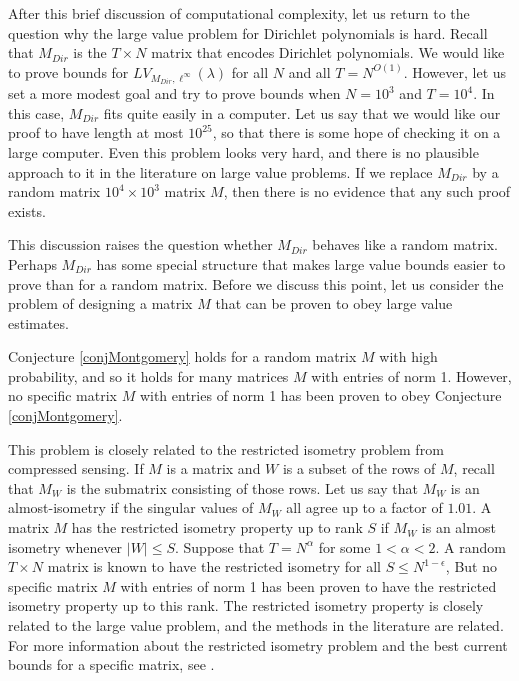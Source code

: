 \documentclass{amsart}
\begin{document}
After this brief discussion of computational complexity, let us return to the question why the large value problem for Dirichlet polynomials is hard. Recall that $M_{Dir}$ is the $T \times N$ matrix that encodes Dirichlet polynomials.   We would like to prove bounds for $LV_{M_{Dir}, \ell^\infty}(\lambda)$ for all $N$ and all $T = N^{O(1)}$.  However, let us set a more modest goal and try to prove bounds when $N= 10^3$ and $T = 10^4$.  In this case, $M_{Dir}$ fits quite easily in a computer.  Let us say that we would like our proof to have length at most $10^{25}$, so that there is some hope of checking it on a large computer.  Even this problem looks very hard, and there is no plausible approach to it in the literature on large value problems.  If we replace $M_{Dir}$ by a random matrix $10^4 \times 10^3$ matrix $M$, then there is no evidence that any such proof exists. 

This discussion raises the question whether $M_{Dir}$ behaves like a random matrix.  Perhaps $M_{Dir}$ has some special structure that makes large value bounds easier to prove than for a random matrix.  Before we discuss this point, let us consider the problem of designing a matrix $M$ that can be proven to obey large value estimates.

Conjecture \ref{conjMontgomery} holds for a random matrix $M$ with high probability, and so it holds for many matrices $M$ with entries of norm 1.  However, no specific matrix $M$ with entries of norm 1 has been proven to obey Conjecture \ref{conjMontgomery}.  

This problem is closely related to the restricted isometry problem from compressed sensing.  If $M$ is a matrix and $W$ is a subset of the rows of $M$, recall that $M_W$ is the submatrix consisting of those rows.  Let us say that $M_W$ is an almost-isometry if the singular values of $M_W$ all agree up to a factor of $1.01$.   A matrix $M$ has the restricted isometry property up to rank $S$ if $M_W$ is an almost isometry whenever $ |W| \le S$.   Suppose that $T = N^\alpha$ for some $1 < \alpha < 2$.   A random $ T \times N$ matrix is known to have the restricted isometry for all $S \le N^{1 - \epsilon}$,  But no specific matrix $M$ with entries of norm 1 has been proven to have the restricted isometry property up to this rank.  The restricted isometry property is closely related to the large value problem, and the methods in the literature are related.  For more information about the restricted isometry problem and the best current bounds for a specific matrix, see \cite{BDFKK}.
\end{document}
